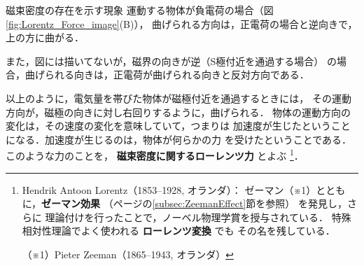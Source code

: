 \begin{mysmallsec}{磁束密度の存在を示す現象}
        運動する物体が負電荷の場合（図\ref{fig:Lorentz_Force_image}(B)），
        曲げられる方向は，正電荷の場合と逆向きで，上の方に曲がる．

        また，図には描いてないが，磁界の向きが逆（S極付近を通過する場合）
        の場合，曲げられる向きは，正電荷が曲げられる向きと反対方向である．

        以上のように，電気量を帯びた物体が磁極付近を通過するときには，
        その運動方向が，磁極の向きに対し右回りするように，曲げられる．
        物体の運動方向の変化は，その速度の変化を意味していて，つまりは
        加速度が生じたということになる．加速度が生じるのは，物体が何らかの力
        を受けたということである．このような力のことを，
        \textbf{磁束密度に関するローレンツ力} とよぶ
            \footnote{
                Hendrik Antoon Lorentz（1853--1928, オランダ）：
                ゼーマン（※1）とともに，\textbf{ゼーマン効果}
                （\pageref{subsec:ZeemanEffect}ページの\ref{subsec:ZeemanEffect}節を参照）
                を発見し，さらに
                理論付けを行ったことで，ノーベル物理学賞を授与されている．
                特殊相対性理論でよく使われる \textbf{ローレンツ変換} でも
                その名を残している．

                （※1）Pieter Zeeman（1865--1943, オランダ）
            }．
    \end{mysmallsec}

